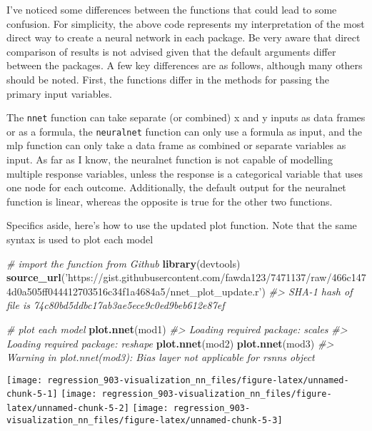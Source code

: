 \documentclass[]{book}
\newenvironment{Shaded}{\begin{snugshade}}{\end{snugshade}}
\newcommand{\CommentTok}[1]{\textcolor[rgb]{0.56,0.35,0.01}{\textit{#1}}}
\newcommand{\KeywordTok}[1]{\textcolor[rgb]{0.13,0.29,0.53}{\textbf{#1}}}
\newcommand{\NormalTok}[1]{#1}
\newcommand{\StringTok}[1]{\textcolor[rgb]{0.31,0.60,0.02}{#1}}
\begin{document}
I've noticed some differences between the functions that could lead to some confusion. For simplicity, the above code represents my interpretation of the most direct way to create a neural network in each package. Be very aware that direct comparison of results is not advised given that the default arguments differ between the packages. A few key differences are as follows, although many others should be noted. First, the functions differ in the methods for passing the primary input variables.

The \texttt{nnet} function can take separate (or combined) x and y inputs as data frames or as a formula, the \texttt{neuralnet} function can only use a formula as input, and the mlp function can only take a data frame as combined or separate variables as input. As far as I know, the neuralnet function is not capable of modelling multiple response variables, unless the response is a categorical variable that uses one node for each outcome. Additionally, the default output for the neuralnet function is linear, whereas the opposite is true for the other two functions.

Specifics aside, here's how to use the updated plot function. Note that the same syntax is used to plot each model

\begin{Shaded}
\begin{Highlighting}[]
\CommentTok{# import the function from Github}
\KeywordTok{library}\NormalTok{(devtools)}
\KeywordTok{source_url}\NormalTok{(}\StringTok{'https://gist.githubusercontent.com/fawda123/7471137/raw/466c1474d0a505ff044412703516c34f1a4684a5/nnet_plot_update.r'}\NormalTok{)}
\CommentTok{#> SHA-1 hash of file is 74c80bd5ddbc17ab3ae5ece9c0ed9beb612e87ef}
 
\CommentTok{# plot each model}
\KeywordTok{plot.nnet}\NormalTok{(mod1)}
\CommentTok{#> Loading required package: scales}
\CommentTok{#> Loading required package: reshape}
\KeywordTok{plot.nnet}\NormalTok{(mod2) }
\KeywordTok{plot.nnet}\NormalTok{(mod3)}
\CommentTok{#> Warning in plot.nnet(mod3): Bias layer not applicable for rsnns object}
\end{Highlighting}
\end{Shaded}

\begin{center}\texttt{[image: regression\_903-visualization\_nn\_files/figure-latex/unnamed-chunk-5-1]} \texttt{[image: regression\_903-visualization\_nn\_files/figure-latex/unnamed-chunk-5-2]} \texttt{[image: regression\_903-visualization\_nn\_files/figure-latex/unnamed-chunk-5-3]} \end{center}
\end{document}
